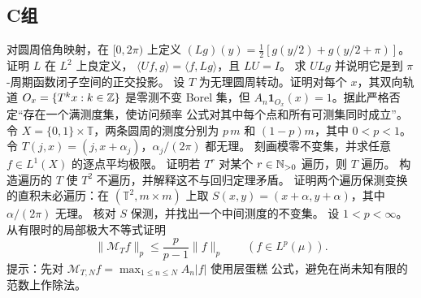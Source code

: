 \subsection*{C组}
\begin{enumerate}[label=\textbf{\thechapter.\arabic*.},resume]
对圆周倍角映射，在 $[0,2\pi)$ 上定义
$(Lg)(y)=\tfrac12[g(y/2)+g(y/2+\pi)]$。证明 $L$ 在 $L^2$ 上良定义，
$\langle Uf,g\rangle=\langle f,Lg\rangle$，且 $LU=I$。
求 $ULg$ 并说明它是到 $\pi$-周期函数闭子空间的正交投影。
设 $T$ 为无理圆周转动。证明对每个 $x$，其双向轨道
$O_x=\{T^kx:k\in\mathbb{Z}\}$ 是零测不变 Borel 集，但
$A_n\mathbf1_{O_x}(x)=1$。据此严格否定“存在一个满测度集，使访问频率
公式对其中每个点和所有可测集同时成立”。
令 $X=\{0,1\}\times\mathbb T$，两条圆周的测度分别为
$p\,m$ 和 $(1-p)m$，其中 $0<p<1$。令
$T(j,x)=(j,x+\alpha_j)$，$\alpha_j/(2\pi)$ 都无理。
刻画模零不变集，并求任意 $f\in L^1(X)$ 的逐点平均极限。
证明若 $T^r$ 对某个 $r\in\mathbb{N}_{>0}$ 遍历，则 $T$ 遍历。
构造遍历的 $T$ 使 $T^2$ 不遍历，并解释这不与回归定理矛盾。
证明两个遍历保测变换的直积未必遍历：在
$(\mathbb T^2,m\times m)$ 上取
$S(x,y)=(x+\alpha,y+\alpha)$，其中 $\alpha/(2\pi)$ 无理。
核对 $S$ 保测，并找出一个中间测度的不变集。
设 $1<p<\infty$。从有限时的局部极大不等式证明
\[
 \|\mathcal M_Tf\|_p\le\frac p{p-1}\|f\|_p
 \qquad(f\in L^p(\mu)).
\]
提示：先对 $\mathcal M_{T,N}f=\max_{1\le n\le N}A_n|f|$ 使用层蛋糕
公式，避免在尚未知有限的范数上作除法。
\end{enumerate}
